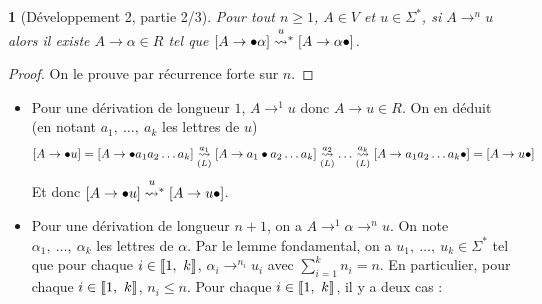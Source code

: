 \documentclass[10pt,a4paper,notitlepage]{article}
\theoremstyle{plain}
\theoremstyle{definition}
\theoremstyle{definition}
\theoremstyle{remark}
\theoremstyle{remark}
\theoremstyle{plain}
\newtheorem{lem}[thm]{\protect\lemmaname}
\theoremstyle{plain}
\theoremstyle{plain}
\theoremstyle{remark}
\providecommand{\lemmaname}{Lemme}
\begin{document}
\begin{lem}[Développement 2, partie 2/3]
	Pour tout $n\ge1$, $A\in V$ et $u\in\Sigma^{*}$, si $A\to^{n}u$
	alors il existe $A\to\alpha\in R$ tel que $\left[A\to\bullet\alpha\right]\transitionn u*\left[A\to\alpha\bullet\right]$.\label{lem:regle}\end{lem}
\begin{proof}
	On le prouve par récurrence forte sur $n$.\end{proof}
\begin{itemize}
	\item Pour une dérivation de longueur $1$, $A\to^{1}u$ donc $A\to u\in R$.
	On en déduit (en notant $a_{1},\ \dots,\ a_{k}$ les lettres de $u$)
	\[
	\left[A\to\bullet u\right]=\left[A\to\bullet a_{1}a_{2}\dots a_{k}\right]\underset{(L)}{\overset{a_{1}}{\leadsto}}\left[A\to a_{1}\bullet a_{2}\dots a_{k}\right]\underset{(L)}{\overset{a_{2}}{\leadsto}}\dots\underset{(L)}{\overset{a_{k}}{\leadsto}}\left[A\to a_{1}a_{2}\dots a_{k}\bullet\right]=\left[A\to u\bullet\right]
	\]
	Et donc $\left[A\to\bullet u\right]\transitionn u*\left[A\to u\bullet\right]$.
	\item Pour une dérivation de longueur $n+1$, on a $A\to^{1}\alpha\to^{n}u$.
	On note $\alpha_{1},\ \dots,\ \alpha_{k}$ les lettres de $\alpha$.
	Par le lemme fondamental, on a $u_{1},\ \dots,\ u_{k}\in\Sigma^{*}$
	tel que pour chaque $i\in\left\llbracket 1,\ k\right\rrbracket$, $\alpha_{i}\to^{n_{i}}u_{i}$
	avec ${\displaystyle \sum_{i=1}^{k}}n_{i}=n$. En particulier, pour
	chaque $i\in\left\llbracket 1,\ k\right\rrbracket$, $n_{i}\le n$. Pour chaque $i\in\left\llbracket 1,\ k\right\rrbracket$,
	il y a deux cas :
	

\end{itemize}
\end{document}
